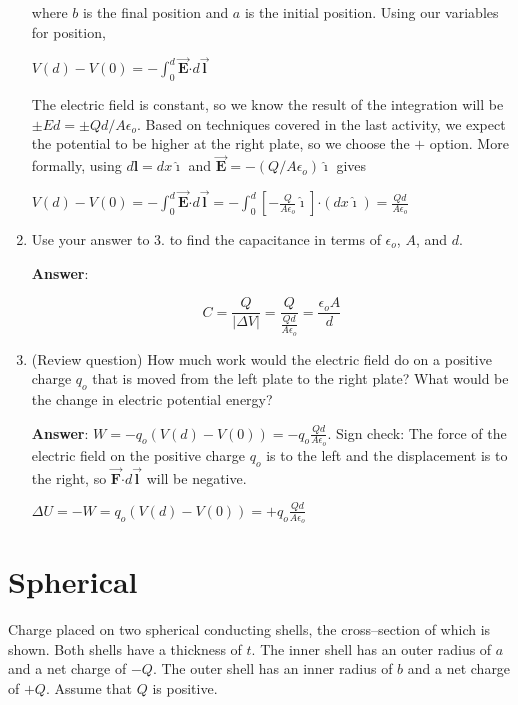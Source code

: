 \documentclass{article}
\newcommand{\ds}[0]{\displaystyle}
\newcommand{\ihat}[0]{\hat{\boldsymbol{\imath}}}
\newcommand{\bfvec}[1]{\vec{\mathbf{#1}}}
\newcommand{\bfcdot}[0]{\boldsymbol{\cdot}}
\begin{document}
\begin{enumerate}
        where $b$ is the final position and $a$ is the initial position. Using our variables for position,

        $\ds V(d)-V(0) = -\int_0^d\bfvec{E}\bfcdot d\bfvec{l}$

        The electric field is constant, so we know the result of the integration will be $\pm Ed=\pm Qd/A\epsilon_o$. Based on techniques covered in the last activity, we expect the potential to be higher at the right plate, so we choose the $+$ option. More formally, using $d\mathbf{l}=dx\ihat$  and $\bfvec{E}=-({Q}/{A\epsilon_o})\ihat$ gives

        $\ds V(d)-V(0) = -\int_0^d\bfvec{E}\bfcdot d\bfvec{l}=-\int_0^d\left[-\frac{Q}{A\epsilon_o}\ihat\right]\bfcdot (dx\ihat)=\frac{Qd}{A\epsilon_o}$
        \else
        \vskip 36pt
        \fi

  \item Use your answer to 3. to find the capacitance in terms of $\epsilon_o$, $A$, and $d$.

        \ifsolutions
        {\bf Answer}:

        $$C = \frac{Q}{|\Delta V|} = \frac{Q}{\frac{Qd}{A\epsilon_o}}=\frac{\epsilon_oA}{d}$$
        \else
        \vskip 36pt
        \fi

  \item (Review question) How much work would the electric field do on a positive charge $q_o$ that is moved from the left plate to the right plate? What would be the change in electric potential energy?

        \ifsolutions
        {\bf Answer}: $\ds W=-q_o(V(d)-V(0))=-q_o\frac{Qd}{A\epsilon_o}$. Sign check: The force of the electric field on the positive charge $q_o$ is to the left and the displacement is to the right, so $\bfvec{F}\bfcdot d\bfvec{l}$ will be negative.

        $\ds\Delta U=-W=q_o(V(d)-V(0))=+q_o\frac{Qd}{A\epsilon_o}$
        \else
        \vskip 36pt
        \fi

\end{enumerate}

\section{Spherical}

Charge placed on two spherical conducting shells, the cross--section of which is shown. Both shells have a thickness of $t$. The inner shell has an outer radius of $a$ and a net charge of $-Q$. The outer shell has an inner radius of $b$ and a net charge of $+Q$. Assume that $Q$ is positive.
\end{document}
